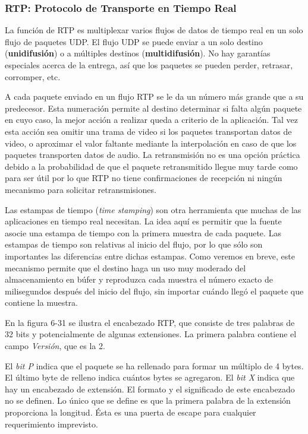 \documentclass[10pt,a4paper]{report}
\begin{document}
\subsubsection{RTP: Protocolo de Transporte en Tiempo Real}

	\par La función de RTP es multiplexar varios flujos de datos de tiempo real en un solo flujo de paquetes UDP. El flujo UDP se puede enviar a un solo destino (\textbf{unidifusión}) o a múltiples destinos (\textbf{multidifusión}). No hay garantías especiales acerca de la entrega, así que los paquetes se pueden perder, retrasar, corromper, etc.
		
	\par A cada paquete enviado en un flujo RTP se le da un número más grande que a su predecesor. Esta numeración permite al destino determinar si falta algún paquete en cuyo caso, la mejor acción a realizar queda a criterio de la aplicación. Tal vez esta acción sea omitir una trama de video si los paquetes transportan datos de video, o aproximar el valor faltante mediante la interpolación en caso de que los paquetes transporten datos de audio. La retransmisión no es una opción práctica debido a la probabilidad de que el paquete retransmitido llegue muy tarde como para ser útil por lo que RTP no tiene confirmaciones de recepción ni ningún mecanismo para solicitar retransmisiones.

	\par Las estampas de tiempo (\textit{time stamping}) son otra herramienta que muchas de las aplicaciones en tiempo real necesitan. La idea aquí es permitir que la fuente asocie una estampa de tiempo con la primera muestra de cada paquete. Las estampas de tiempo son relativas al inicio del flujo, por lo que sólo son importantes las diferencias entre dichas estampas. Como veremos en breve, este mecanismo permite que el destino haga un uso muy moderado del almacenamiento en búfer y reproduzca cada muestra el número exacto de milisegundos después del inicio del flujo, sin importar cuándo llegó el paquete que contiene la muestra.
	
	\par En la figura 6-31 se ilustra el encabezado RTP, que consiste de tres palabras de 32 bits y potencialmente de algunas extensiones. La primera palabra contiene el campo \textit{Versión}, que es la 2.

	\par El \textit{bit P} indica que el paquete se ha rellenado para formar un múltiplo de 4 bytes. El último byte de relleno indica cuántos bytes se agregaron. El \textit{bit X} indica que hay un encabezado de extensión. El formato y el significado de este encabezado no se definen. Lo único que se define es que la primera palabra de la extensión proporciona la longitud. Ésta es una puerta de escape para cualquier requerimiento imprevisto.
\end{document}
